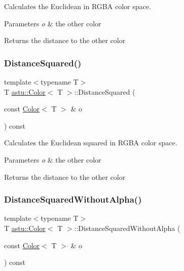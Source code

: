 Calculates the Euclidean in R\+G\+BA color space.


\begin{DoxyParams}{Parameters}
{\em o} & the other color \\
\hline
\end{DoxyParams}
\begin{DoxyReturn}{Returns}
the distance to the other color 
\end{DoxyReturn}
\mbox{\label{classastu_1_1Color_a9b396fa9b0d3612ec9eb372b52de1eac}} 
\subsubsection{\texorpdfstring{Distance\+Squared()}{DistanceSquared()}}
{\footnotesize\ttfamily template$<$typename T$>$ \\
T \hyperlink{classastu_1_1Color}{astu\+::\+Color}$<$ T $>$\+::Distance\+Squared (\begin{DoxyParamCaption}\item[{const \hyperlink{classastu_1_1Color}{Color}$<$ T $>$ \&}]{o }\end{DoxyParamCaption}) const\hspace{0.3cm}{\ttfamily [inline]}}

Calculates the Euclidean squared in R\+G\+BA color space.


\begin{DoxyParams}{Parameters}
{\em o} & the other color \\
\hline
\end{DoxyParams}
\begin{DoxyReturn}{Returns}
the distance to the other color 
\end{DoxyReturn}
\mbox{\label{classastu_1_1Color_a35549a6d06ab1fbc8a232508e3041f9d}} 
\subsubsection{\texorpdfstring{Distance\+Squared\+Without\+Alpha()}{DistanceSquaredWithoutAlpha()}}
{\footnotesize\ttfamily template$<$typename T$>$ \\
T \hyperlink{classastu_1_1Color}{astu\+::\+Color}$<$ T $>$\+::Distance\+Squared\+Without\+Alpha (\begin{DoxyParamCaption}\item[{const \hyperlink{classastu_1_1Color}{Color}$<$ T $>$ \&}]{o }\end{DoxyParamCaption}) const\hspace{0.3cm}{\ttfamily [inline]}}

